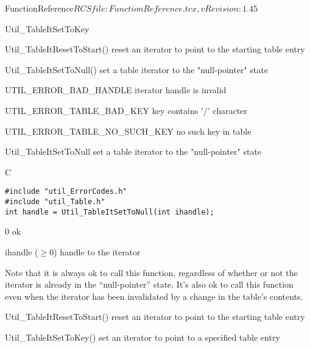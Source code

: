 \begin{cactuspart}{5}{FunctionReference}{$RCSfile: FunctionReference.tex,v $}{$Revision: 1.45 $}
\begin{FunctionDescription}{Util\_TableItSetToKey}
\begin{SeeAlso}{Util\_TableItResetToStart()}
reset an iterator to point to the starting table entry
\end{SeeAlso}
\begin{SeeAlso}{Util\_TableItSetToNull()}
set a table iterator to the "null-pointer" state
\end{SeeAlso}

\begin{Error}{UTIL\_ERROR\_BAD\_HANDLE}
iterator handle is invalid
\end{Error}
\begin{Error}{UTIL\_ERROR\_TABLE\_BAD\_KEY}
key contains '/' character
\end{Error}
\begin{Error}{UTIL\_ERROR\_TABLE\_NO\_SUCH\_KEY}
no such key in table
\end{Error}
\end{FunctionDescription}


\begin{FunctionDescription}{Util\_TableItSetToNull}
\label{Util-TableItSetToNull}
set a table iterator to the "null-pointer" state

\begin{Synopsis}{C}
\begin{verbatim}
#include "util_ErrorCodes.h"
#include "util_Table.h"
int handle = Util_TableItSetToNull(int ihandle);
\end{verbatim}
\end{Synopsis}

\begin{Result}{\rm 0}
ok
\end{Result}

\begin{Parameter}{ihandle ($\ge 0$)}
handle to the iterator
\end{Parameter}

\begin{Discussion}
Note that it is always ok to call this function, regardless of
whether or not the iterator is already in the ``null-pointer'' state.
\NewPar
It's also ok to call this function even when the iterator has been
invalidated by a change in the table's contents.
\end{Discussion}

\begin{SeeAlso}{Util\_TableItResetToStart()}
reset an iterator to point to the starting table entry
\end{SeeAlso}
\begin{SeeAlso}{Util\_TableItSetToKey()}
set an iterator to point to a specified table entry
\end{SeeAlso}


\end{FunctionDescription}
\end{cactuspart}
